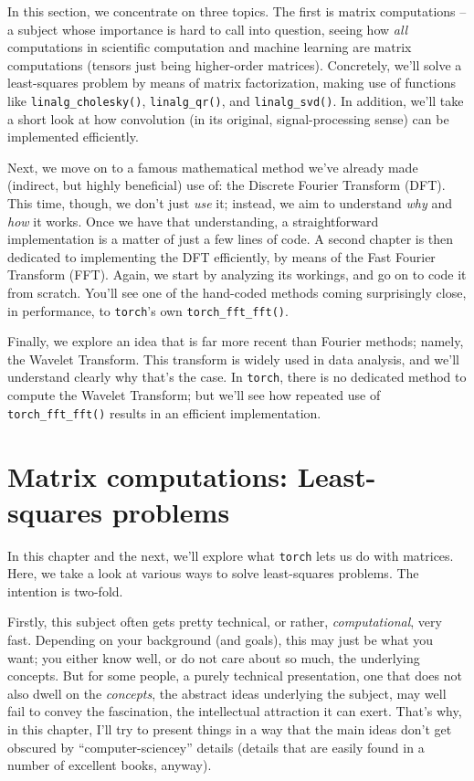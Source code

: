 \documentclass[
  letterpaper,
]{krantz}
\begin{document}
In this section, we concentrate on three topics. The first is matrix
computations -- a subject whose importance is hard to call into
question, seeing how \emph{all} computations in scientific computation
and machine learning are matrix computations (tensors just being
higher-order matrices). Concretely, we'll solve a least-squares problem
by means of matrix factorization, making use of functions like
\texttt{linalg\_cholesky()}, \texttt{linalg\_qr()}, and
\texttt{linalg\_svd()}. In addition, we'll take a short look at how
convolution (in its original, signal-processing sense) can be
implemented efficiently.

Next, we move on to a famous mathematical method we've already made
(indirect, but highly beneficial) use of: the Discrete Fourier Transform
(DFT). This time, though, we don't just \emph{use} it; instead, we aim
to understand \emph{why} and \emph{how} it works. Once we have that
understanding, a straightforward implementation is a matter of just a
few lines of code. A second chapter is then dedicated to implementing
the DFT efficiently, by means of the Fast Fourier Transform (FFT).
Again, we start by analyzing its workings, and go on to code it from
scratch. You'll see one of the hand-coded methods coming surprisingly
close, in performance, to \texttt{torch}'s own
\texttt{torch\_fft\_fft()}.

Finally, we explore an idea that is far more recent than Fourier
methods; namely, the Wavelet Transform. This transform is widely used in
data analysis, and we'll understand clearly why that's the case. In
\texttt{torch}, there is no dedicated method to compute the Wavelet
Transform; but we'll see how repeated use of \texttt{torch\_fft\_fft()}
results in an efficient implementation.

\hypertarget{sec:matrix-computations-1}{%
\chapter{Matrix computations: Least-squares
problems}\label{sec:matrix-computations-1}}

In this chapter and the next, we'll explore what \texttt{torch} lets us
do with matrices. Here, we take a look at various ways to solve
least-squares problems. The intention is two-fold.

Firstly, this subject often gets pretty technical, or rather,
\emph{computational}, very fast. Depending on your background (and
goals), this may just be what you want; you either know well, or do not
care about so much, the underlying concepts. But for some people, a
purely technical presentation, one that does not also dwell on the
\emph{concepts}, the abstract ideas underlying the subject, may well
fail to convey the fascination, the intellectual attraction it can
exert. That's why, in this chapter, I'll try to present things in a way
that the main ideas don't get obscured by ``computer-sciencey'' details
(details that are easily found in a number of excellent books, anyway).
\end{document}
